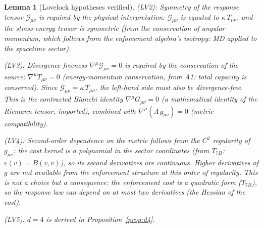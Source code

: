 \documentclass[11pt,a4paper]{article}
\newtheorem{lemma}[theorem]{Lemma}
\theoremstyle{definition}
\begin{document}
\begin{lemma}[Lovelock hypotheses verified]
(LV2): Symmetry of the response tensor $\mathcal{G}_{\mu\nu}$ is
required by the physical interpretation: $\mathcal{G}_{\mu\nu}$ is
equated to $\kappa\,T_{\mu\nu}$, and the stress-energy tensor is
symmetric (from the conservation of angular momentum, which follows
from the enforcement algebra's isotropy: MD applied to the spacetime
sector).

(LV3): Divergence-freeness $\nabla^\mu \mathcal{G}_{\mu\nu} = 0$ is
required by the conservation of the source: $\nabla^\mu T_{\mu\nu} = 0$
(energy-momentum conservation, from A1: total capacity is conserved).
Since $\mathcal{G}_{\mu\nu} = \kappa\, T_{\mu\nu}$, the left-hand side
must also be divergence-free.  This is the contracted Bianchi identity
$\nabla^\mu G_{\mu\nu} = 0$ (a mathematical identity of the Riemann
tensor, imported), combined with
$\nabla^\mu(\Lambda\, g_{\mu\nu}) = 0$ (metric compatibility).

(LV4): Second-order dependence on the metric follows from the $C^2$
regularity of $g_{\mu\nu}$: the cost kernel is a polynomial in the
sector coordinates (from $T_{7B}$: $\varepsilon(v) = B(v,v)$), so its
second derivatives are continuous.  Higher derivatives of $g$ are not
available from the enforcement structure at this order of regularity.
This is not a choice but a consequence: the enforcement cost is a
quadratic form ($T_{7B}$), so the response law can depend on at most
two derivatives (the Hessian of the cost).

(LV5): $d = 4$ is derived in
Proposition~\ref{prop:d4}.
\end{lemma}
\end{document}
